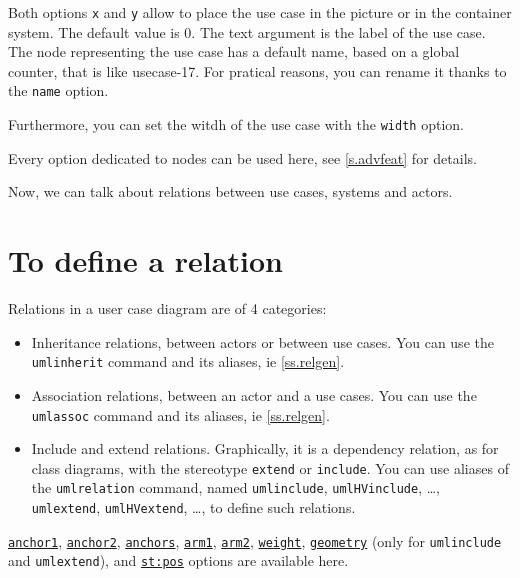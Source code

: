 \documentclass[a4paper,11pt]{report}
\begin{document}
\medskip

Both options {\tt x} and {\tt y} allow to place the use case in the picture or in the container system. The default value is 0. The text argument is the label of the use case. The node representing the use case has a default name, based on a global counter, that is like usecase-17. For pratical reasons, you can rename it thanks to the {\tt name} option.

Furthermore, you can set the witdh of the use case with the {\tt width} option.

\medskip

Every \TikZ{} option dedicated to nodes can be used here, see \autoref{s.advfeat} for details.

\medskip

Now, we can talk about relations between use cases, systems and actors.

\section{To define a relation}\label{s.userel}

Relations in a user case diagram are of 4 categories:

\begin{itemize}
	\item Inheritance relations, between actors or between use cases. You can use the {\tt umlinherit} command and its aliases, ie \autoref{ss.relgen}.
	\item Association relations, between an actor and a use cases. You can use the {\tt umlassoc} command and its aliases, ie \autoref{ss.relgen}.
	\item Include and extend relations. Graphically, it is a dependency relation, as for class diagrams, with the stereotype {\tt extend} or {\tt include}. You can use aliases of the {\tt umlrelation} command, named
		      {\tt umlinclude}, {\tt umlHVinclude}, \ldots, {\tt umlextend}, {\tt umlHVextend}, \ldots, to define such relations.
\end{itemize}

\hyperlink{anchor1}{{\tt anchor1}}, \hyperlink{anchor2}{{\tt anchor2}}, \hyperlink{anchors}{{\tt anchors}}, \hyperlink{arm1}{{\tt arm1}}, \hyperlink{arm2}{{\tt arm2}}, \hyperlink{weight}{{\tt weight}}, \hyperlink{geometry}{{\tt geometry}} (only for {\tt umlinclude} and {\tt umlextend}), and \hyperlink{posstereo}{{\tt st:pos}} options are available here.

\medskip
\end{document}
